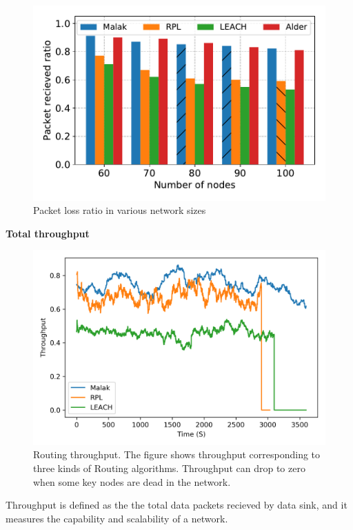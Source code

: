 \begin{figure}[htbp]
	\centering
	\includegraphics[width=.85\columnwidth]{Figure/packet_loss_ratio_with_size}
	\vspace{-0.1in}
	\caption{Packet loss ratio in various network sizes
		\textnormal{
		}}
	\label{fig:packet_loss_ratio_with_size}
\end{figure}

\textbf{Total throughput}

\begin{figure}[htbp]
	\centering
	\includegraphics[width=.85\columnwidth]{Figure/throughput}
	\vspace{-0.1in}
	\caption{Routing throughput.
		\textnormal{
			The figure shows throughput corresponding to three kinds of Routing
			algorithms. Throughput can drop to zero when some key nodes are dead
			in the network.
		}}
	\label{fig:throughput}
\end{figure}

Throughput is defined as the the total data packets recieved by data sink, and it
measures the capability and scalability of a network.

